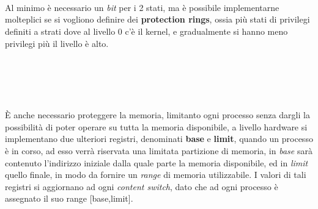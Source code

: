 \documentclass[12pt, letterpaper]{article}
\begin{document}
     \hphantom{,}\\ \hphantom{,}\\ \hphantom{,}\\Al minimo è necessario un \textit{bit} per i 2 stati, ma è possibile implementarne molteplici 
se si vogliono definire dei \textbf{protection rings}, ossia più stati di privilegi definiti a strati 
dove al livello 0 c'è il kernel, e gradualmente si hanno meno privilegi più il livello è alto. \hphantom{,}\\
\hphantom{,}\\ \hphantom{,}\\ \hphantom{,}\\ \hphantom{,}\\ \hphantom{,}\\
È anche necessario proteggere la memoria, limitanto ogni processo senza dargli la possibilità di poter
operare su tutta la memoria disponibile, a livello hardware si implementano due ulteriori registri, denominati
\textbf{base} e \textbf{limit}, quando un processo è in corso, ad esso verrà riservata una limitata partizione 
di memoria, in \textit{base} sarà contenuto l'indirizzo iniziale dalla quale parte la memoria disponibile, 
ed in \textit{limit} quello finale, in modo da fornire un \textit{range} di memoria utilizzabile. I valori di 
tali registri si aggiornano ad ogni \textit{content switch}, dato che ad ogni processo è assegnato il suo 
range [base,limit].
\end{document}
